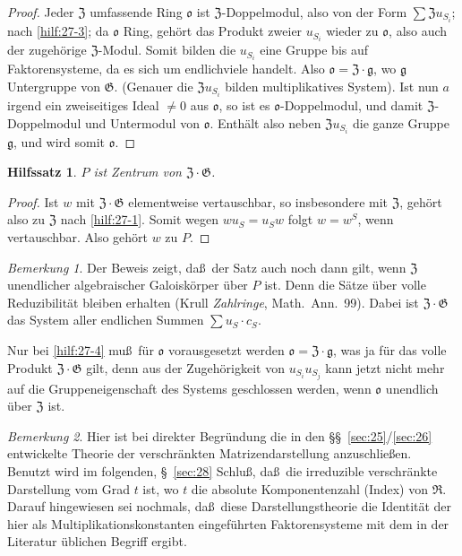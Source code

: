 \documentclass[12pt,a4paper]{article}
\theoremstyle{plain}
\newtheorem{hilfssatz}{Hilfssatz}[section]
\theoremstyle{definition}
\theoremstyle{remark}
\newtheorem{bemerkung}{Bemerkung}[section]
\begin{document}
\begin{proof}
Jeder $\mathfrak{Z}$ umfassende Ring $\mathfrak{o}$ ist $\mathfrak{Z}$-Doppelmodul, also von der
Form $\sum \mathfrak{Z}u_{S_{i}}$; nach \ref{hilf:27-3}; da $\mathfrak{o}$ Ring, geh\"ort das
Produkt zweier $u_{S_{i}}$ wieder zu $\mathfrak{o}$, also auch der zugeh\"orige
$\mathfrak{Z}$-Modul. Somit bilden die $u_{S_{i}}$ eine Gruppe bis auf
Faktorensysteme, da es sich um endlichviele handelt. Also
$\mathfrak{o} = \mathfrak{Z} \cdot \mathfrak{g}$, wo $\mathfrak{g}$ Untergruppe von $\mathfrak{G}$. (Genauer
die $\mathfrak{Z}u_{S_{i}}$ bilden multiplikatives System). Ist nun $a$ irgend
ein zweiseitiges Ideal $\neq 0$ aus $\mathfrak{o}$, so ist es $\mathfrak{o}$-Doppelmodul,
und damit $\mathfrak{Z}$-Doppelmodul und Untermodul von $\mathfrak{o}$. Enth\"alt
also neben $\mathfrak{Z}u_{S_{i}}$ die ganze Gruppe $\mathfrak{g}$, und wird somit
$\mathfrak{o}$.
\end{proof}

\begin{hilfssatz}\label{hilf:27-5}
$P$ ist Zentrum von $\mathfrak{Z} \cdot \mathfrak{G}$.
\end{hilfssatz}

\begin{proof}
Ist $w$ mit $\mathfrak{Z} \cdot \mathfrak{G}$ elementweise vertauschbar, so
insbesondere mit $\mathfrak{Z}$, geh\"ort also zu $\mathfrak{Z}$ nach \ref{hilf:27-1}.
Somit wegen $wu_{S} = u_{S}w$ folgt $w = w^{S}$, wenn vertauschbar. Also
geh\"ort $w$ zu $P$.
\end{proof}

\begin{bemerkung}\label{bem:27-1}
Der Beweis zeigt, da\ss\ der Satz auch noch dann gilt, wenn $\mathfrak{Z}$
unendlicher algebraischer Galoisk\"orper \"uber $P$ ist. Denn die
S\"atze \"uber volle Reduzibilit\"at bleiben erhalten (Krull
\textit{Zahlringe}, Math.\ Ann.\ 99). Dabei ist $\mathfrak{Z} \cdot \mathfrak{G}$ das System
aller endlichen Summen $\sum u_{S} \cdot c_{S}$.

Nur bei \ref{hilf:27-4} mu\ss\ f\"ur $\mathfrak{o}$ vorausgesetzt werden
$\mathfrak{o} = \mathfrak{Z} \cdot \mathfrak{g}$, was ja f\"ur das volle Produkt
$\mathfrak{Z} \cdot \mathfrak{G}$ gilt, denn aus der Zugeh\"origkeit von
$u_{S_{i}}u_{S_{j}}$ kann jetzt nicht mehr auf die Gruppeneigenschaft des
Systems geschlossen werden, wenn $\mathfrak{o}$ unendlich \"uber $\mathfrak{Z}$ ist.
\end{bemerkung}

\begin{bemerkung}\label{bem:27-2}
Hier ist bei direkter Begr\"undung die in den \S\S~\ref{sec:25}/\ref{sec:26}
entwickelte Theorie der verschr\"ankten Matrizendarstellung
anzuschlie\ss en. Benutzt wird im folgenden, \S~\ref{sec:28} Schlu\ss, da\ss\ die irreduzible verschr\"ankte Darstellung vom Grad $t$ ist, wo $t$ die
absolute Komponentenzahl (Index) von $\mathfrak{R}$. Darauf hingewiesen sei
nochmals, da\ss\ diese Darstellungstheorie die Identit\"at der hier als
Multiplikationskonstanten eingef\"uhrten Faktorensysteme mit dem in der
Literatur \"ublichen Begriff ergibt.
\end{bemerkung}
\end{document}
